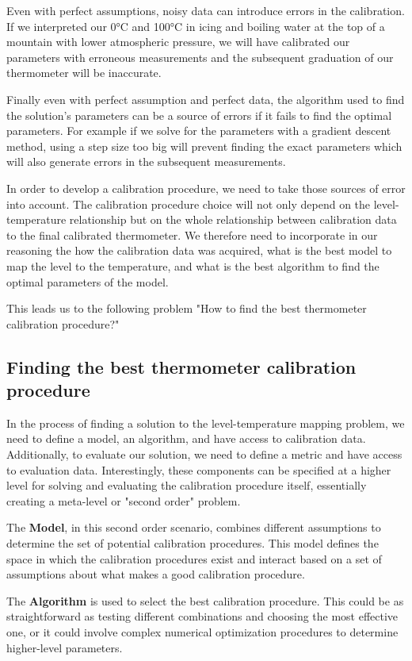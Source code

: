 \begin{bibunit}
 Even with perfect assumptions, noisy data can introduce errors in the calibration. If we interpreted our 0°C and 100°C in icing and boiling water at the top of a mountain with lower atmospheric pressure, we will have calibrated our parameters with erroneous measurements and the subsequent graduation of our thermometer will be inaccurate.

 Finally even with perfect assumption and perfect data, the algorithm used to find the solution's parameters can be a source of errors if it fails to find the optimal parameters. For example if we solve for the parameters with a gradient descent method, using a step size too big will prevent finding the exact parameters which will also generate errors in the subsequent measurements.

In order to develop a calibration procedure, we need to take those sources of error into account. The calibration procedure choice will not only depend on the level-temperature relationship but on the whole relationship between calibration data to the final calibrated thermometer. We therefore need to incorporate in our reasoning the how the calibration data was acquired, what is the best model to map the level to the temperature, and what is the best algorithm to find the optimal parameters of the model.

This leads us to the following problem "How to find the best thermometer calibration procedure?"

\subsection{Finding the best thermometer calibration procedure}
In the process of finding a solution to the level-temperature mapping problem, we need to define a model, an algorithm, and have access to calibration data. Additionally, to evaluate our solution, we need to define a metric and have access to evaluation data. Interestingly, these components can be specified at a higher level for solving and evaluating the calibration procedure itself, essentially creating a meta-level or "second order" problem.

The \textbf{Model}, in this second order scenario, combines different assumptions to determine the set of potential calibration procedures. This model defines the space in which the calibration procedures exist and interact based on a set of assumptions about what makes a good calibration procedure.

The \textbf{Algorithm} is used to select the best calibration procedure. This could be as straightforward as testing different combinations and choosing the most effective one, or it could involve complex numerical optimization procedures to determine higher-level parameters.


\end{bibunit}
